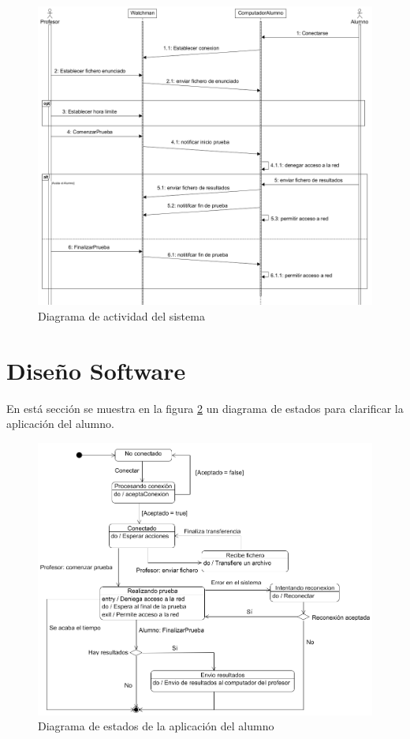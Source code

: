 \begin{figure}
    \centering
    \includegraphics[width=\linewidth]{arquitectura/actividadSistema4}
    \caption{Diagrama de actividad del sistema}
    \label{fig:arquitectura:actividadSistema}
\end{figure}

\section{Diseño Software}
\label{sec:arquitectura:diseno}

En está sección se muestra en la figura \ref{fig:arquitectura:estadosAlumno} un diagrama de estados para clarificar la aplicación del alumno.
\newline


\begin{figure}
    \centering
    \includegraphics[width=\linewidth]{arquitectura/estadosAlumno3}
    \caption{Diagrama de estados de la aplicación del alumno}
    \label{fig:arquitectura:estadosAlumno}
\end{figure}


